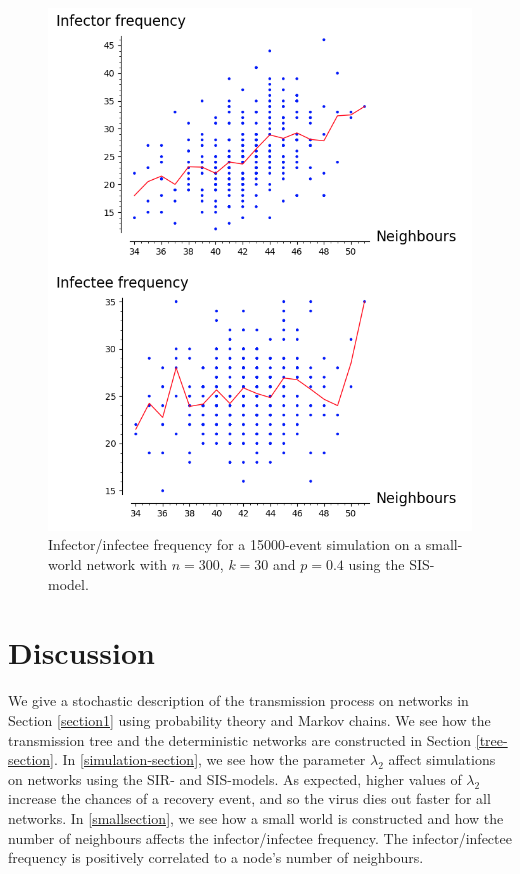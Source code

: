 \documentclass[12pt]{article} %
\numberwithin{equation}{section}
\begin{document}
\begin{figure}
    \centering
    \includegraphics[scale=0.7]{sissmallworld.png}   
    \caption{Infector/infectee frequency for a 15000-event simulation on a small-world network with $n=300$, $k=30$ and $p=0.4$ using the SIS-model.}
    \label{SWresultplot}
\end{figure}
\FloatBarrier
\section{Discussion}
We give a stochastic description of the transmission process on networks in Section \ref{section1} using probability theory and Markov chains. We see how the transmission tree and the deterministic networks are constructed in Section \ref{tree-section}. In \ref{simulation-section}, we see how the parameter $\lambda_2$ affect simulations on networks using the SIR- and SIS-models. As expected, higher values of $\lambda_2$ increase the chances of a recovery event, and so the virus dies out faster for all networks. In \ref{smallsection}, we see how a small world is constructed and how the number of neighbours affects the infector/infectee frequency. The infector/infectee frequency is positively correlated to a node's number of neighbours.
\end{document}
